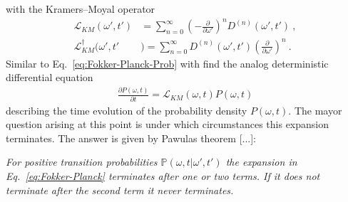 \documentclass[11pt,a4paper]{article}
\numberwithin{equation}{section}
\begin{document}
with the Kramers--Moyal operator
\begin{align*}
\mathcal{L}_{KM}(\omega',t')&=\sum_{n=0}^{\infty}\left(- \frac{\partial}{\partial \omega'}\right)^nD^{(n)}(\omega',t')~,\\
\mathcal{L}_{KM}^{\dagger}(\omega',t'&)=\sum_{n=0}^{\infty}D^{(n)}(\omega',t')\left( \frac{\partial}{\partial \omega'}\right)^n~.
\end{align*} 
Similar to Eq.~\eqref{eq:Fokker-Planck-Prob} with find the analog deterministic differential equation
\begin{align}
\label{eq:Fokker-Planck}
\frac{\partial P(\omega,t)}{\partial t}
=
\mathcal{L}_{KM}(\omega,t)P(\omega,t)
\end{align}
describing the time evolution of the probability density $P(\omega,t)$.
%
The mayor question arising at this point is under which circumstances this expansion terminates.
%
The answer is given by Pawulas theorem [...]:

\textit{
For positive transition probabilities $\mathbb{P}(\omega, t| \omega', t')$ the expansion in Eq.~\eqref{eq:Fokker-Planck} terminates after one or two terms. If it does not terminate after the second term it never terminates. 
}
\end{document}

